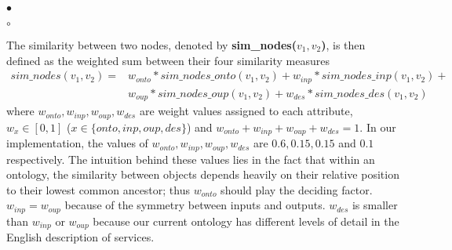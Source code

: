 \documentclass{new_tlp}
\begin{document}
{\begin{list}{$\bullet$}{\itemsep=0pt \parsep=1pt \topsep=1pt \leftmargin=10pt}
\begin{list}{$\circ$}{\itemsep=0pt \topsep=0pt \parsep=0pt \leftmargin=6pt}
\end{list}
The similarity between two nodes, denoted by \textbf{sim\_nodes($v_{1},v_{2}$)}, is then defined as the weighted sum between their four similarity 
measures 	  
%
			\[\begin{array}{ll} 
			sim\_nodes(v_{1},v_{2}) = &
			                                              w_{onto}*sim\_nodes\_onto(v_{1},v_{2}) +   
			                                              w_{inp}*sim\_nodes\_inp(v_{1},v_{2}) + \\
			                                             & w_{oup}*sim\_nodes\_oup(v_{1},v_{2}) + 
			                                              w_{des}*sim\_nodes\_des(v_{1},v_{2}) 
			                                              \end{array} 
			                                              \]
%
where $ w_{onto}, w_{inp}, w_{oup}, w_{des}$ are weight values assigned to each attribute, 
$w_x \in [0,1]$ ($x \in \{onto, inp, oup, des\}$) and $w_{onto} +w_ {inp} + w_{oup} + w_{des}= 1$. In our 
implementation, the values of $w_{onto}, w_ {inp} , w_{oup}, w_{des}$ are $0.6, 0.15, 0.15$ and $0.1$ 
respectively. The intuition behind these values lies in the fact that within an ontology, the similarity between objects depends heavily on their relative position to their lowest common ancestor; thus $w_{onto}$ should play the deciding factor. $ w_ {inp} = w_{oup}$ because of the symmetry between inputs and outputs. 
$w_{des}$ is smaller than $ w_ {inp}$ or $w_{oup}$ because our current ontology has different levels of detail in the 
English description of services.
%


\end{list}}
\end{document}
